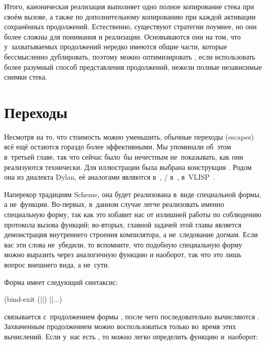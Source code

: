 Итого, каноническая реализация  выполняет одно полное копирование
стека при своём вызове, а также по дополнительному копированию при каждой
активации сохранённых продолжений. Естественно, существуют стратегии поумнее,
но они более сложны для понимания и реализации. Основываются они на том, что
у~захватываемых продолжений нередко \cite{dan87} имеются общие части, которые
бессмысленно дублировать, поэтому можно оптимизировать , если
использовать более разумный способ представления продолжений, нежели полные
независимые снимки стека.


\section{Переходы}\label{compilation/sect:escapes}

Несмотря на то, что стоимость  можно уменьшить, обычные переходы
(escapes) всё ещё остаются гораздо более эффективными. Мы упоминали об~этом
в~третьей главе, так что сейчас было~бы нечестным не~показывать, как они
реализуются технически. Для иллюстрации была выбрана конструкция .
 Родом она из диалекта Dylan, её
аналогами являются  в~{\EuLisp}, \slash{}
в~{\CommonLisp},  в~VLISP~\cite{cha80}.

Наперекор традициям Scheme, она будет реализована в~виде специальной формы, а
не~функции. Во-первых, в~данном случае легче реализовать именно специальную
форму, так как это избавит нас от излишней работы по соблюдению протокола вызова
функций; во-вторых, главной задачей этой главы является демонстрация внутреннего
строения компилятора, а не~следование догмам. Если вас эти слова не~убедили, то
вспомните, что подобную специальную форму можно выразить через аналогичную
функцию и наоборот, так что это лишь вопрос внешнего вида, а не~сути.

Форма  имеет следующий синтаксис:

\begin{code:lisp}
(bind-exit (||) ||...)
\end{code:lisp}

 связывается с~продолжением формы , после чего
последовательно вычисляются . Захваченным продолжением можно
воспользоваться только во~время этих вычислений. Если у~нас есть ,
то можно легко определить функцию  и~наоборот:

